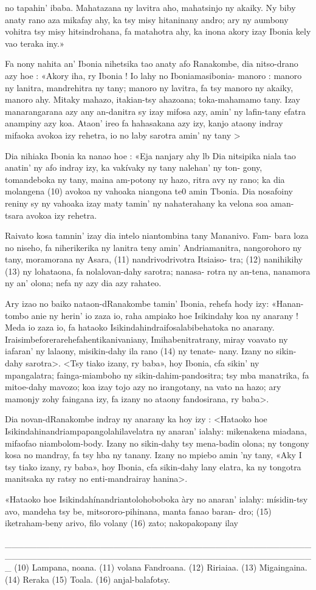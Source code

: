 no tapahin' ibaba. Mahatazana ny lavitra aho, mahatsinjo ny akaiky. Ny
biby anaty rano aza mikafay ahy, ka tsy misy hitaninany andro; ary ny
aumbony vohitra tsy misy hitsindrohana, fa matahotra ahy, ka inona akory
izay Ibonia kely vao teraka iny.»

Fa nony nahita an' Ibonia nihetsika tao anaty afo Ranakombe, dia
nitso-drano azy hoe : «Akory iha, ry Ibonia ! Io lahy no Iboniamasibonia-
manoro : manoro ny lanitra, mandrehitra ny tany; manoro ny lavitra, fa tsy
manoro ny akaiky, manoro ahy. Mitaky mahazo, itakian-tsy ahazoana;
toka-mahamamo tany. Izay manarangarana azy any an-danitra sy izay
mifosa azy, amin' ny lafin-tany efatra anampiny azy koa. Ataon' ireo fa
hahasakana azy izy, kanjo ataony indray mifaoka avokoa izy rehetra, io no
laby sarotra amin' ny tany >

Dia nihiaka Ibonia ka nanao hoe : «Eja nanjary ahy lb Dia nitsipika
niala tao anatin' ny afo indray izy, ka vakívaky ny tany nalehan' ny ton-
gony, tomandeboka ny tany, maina am-potony ny hazo, ritra avy ny rano;
ka dia molangena (10) avokoa ny vahoaka niangona te0 amin Tbonia. Dia
nosafoiny reniny sy ny vahoaka izay maty tamin' ny nahaterahany ka velona
soa aman-tsara avokoa izy rehetra.

Raivato kosa tamnin' izay dia intelo niantombina tany Mananivo. Fam-
bara loza no niseho, fa niherikerika ny lanitra teny amin' Andriamanitra,
nangorohoro ny tany, moramorana ny Asara, (11) nandrivodrivotra Itsiaiso-
tra; (12) nanihikihy (13) ny lohataona, fa nolalovan-dahy sarotra; nanasa-
rotra ny an-tena, nanamora ny an' olona; nefa ny azy dia azy rahateo.

Ary izao no baiko nataon-dRanakombe tamin' Ibonia, rehefa hody izy:
«Hanan-tombo anie ny herin' io zaza io, raha ampiako hoe Isikindahy koa
ny anarany ! Meda io zaza io, fa hataoko Isikindahindraifosalabibehatoka
no anarany. Iraisimbeforerarehefahentikanivaniany, Imihabenitratrany,
miray voavato ny iafaran' ny lalaony, misikin-dahy ila rano (14) ny tenate-
nany. Izany no sikin-dahy sarotra>. <Tsy tiako izany, ry baba», hoy Ibonia,
cfa sikin' ny mpangalatra; fainga-miamboho ny sikin-dahim-pandositra; tsy
mba manatrika, fa mitoe-dahy mavozo; koa izay tojo azy no irangotany,
na vato na hazo; ary mamonjy zohy faingana izy, fa izany no ataony
fandosirana, ry baba>.

Dia novan-dRanakombe indray ny anarany ka hoy izy : <Hataoko hoe
Isikindahinandriampapangolahilavelatra ny anaran' ialahy: mikenakena
miadana, mifaofao niambolom-body. Izany no sikin-dahy tsy mena-badin
olona; ny tongony kosa no mandray, fa tsy hba ny tanany. Izany no
mpiebo amin 'ny tany, «Aky I tsy tiako izany, ry baba», hoy Ibonia, cfa
sikin-dahy lany elatra, ka ny tongotra manitsaka ny ratsy no enti-mandrairay
hanina>.

«Hataoko hoe Isikindahínandriantolohoboboka àry no anaran' ialahy:
mísidin-tsy avo, mandeha tsy be, mitsororo-pihinana, manta fanao baran-
dro; (15) iketraham-beny arivo, filo volany (16) zato; nakopakopany ilay

_________________________________________________________________________________________________
(10) Lampana, noana. 
(11) volana Fandroana. 
(12) Ririaiaa. 
(13) Migaingaina. 
(14) Reraka
(15) Toala. 
(16) anjal-balafotsy.
